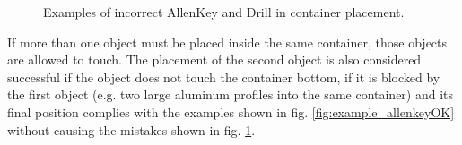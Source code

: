 \begin{figure}[h!]
	\begin{center}
		 \hfill
		 \hfill
		 \hfill
		 \hfill	
\end{center}
	\caption{Examples of incorrect AllenKey and Drill  in container placement.}
	\label{fig:example_allenkeyNOTOK}
\end{figure}

If more than one object must be placed inside the same container, those objects are allowed to touch. 
The placement of the second object is also considered successful if the object does not touch the container bottom, 
if it is blocked by the first object (e.g. two large aluminum profiles into the same container) and its final position complies with the examples shown in fig. \ref{fig:example_allenkeyOK} without causing the mistakes shown in fig. \ref{fig:example_allenkeyNOTOK}.


